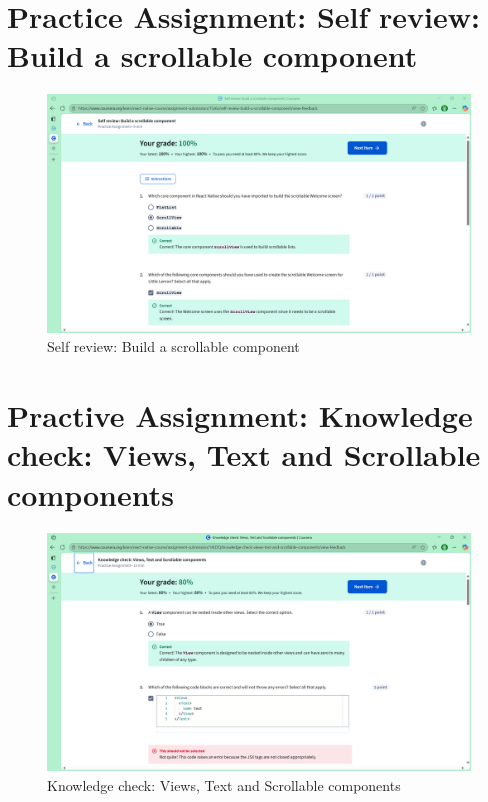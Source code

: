 \section{Practice Assignment: Self review: Build a scrollable component}
\begin{figure}[H]
    \centering
    \includegraphics[width=0.5\linewidth]{images/self-review-3.pdf}
    \caption{Self review: Build a scrollable component}
    \label{fig:placeholder}
\end{figure}

\section{Practive Assignment: Knowledge check: Views, Text and Scrollable components}
\begin{figure}[H]
    \centering
    \includegraphics[width=0.5\linewidth]{images/knowledge-checking-3.pdf}
    \caption{Knowledge check: Views, Text and Scrollable components}
    \label{fig:placeholder}
\end{figure}